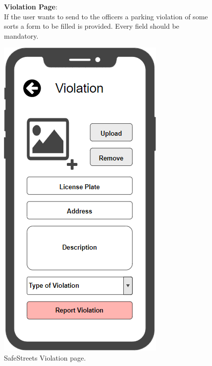 \begin{figure}
	\begin{flushleft}
		\textbf{Violation Page}:\\
		If the user wants to send to the officers a parking violation of some sorts a form to be filled is provided. Every field should be mandatory.
	\end{flushleft}
	\centering
	\includegraphics[width=0.6\linewidth]{images/mockups/violation}
	\caption{SafeStreets Violation page.}
	\label{fig:violation}
\end{figure}
\clearpage
